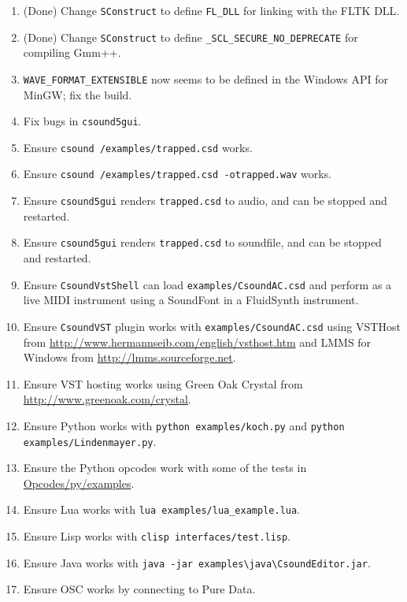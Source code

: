 \documentclass[11pt,letterpaper,onecolumn]{scrartcl}
\begin{document}
\begin{sloppypar}
\begin{enumerate}
	\item (Done) Change \texttt{SConstruct} to define \verb|FL_DLL| for linking with the FLTK DLL.
	\item (Done) Change \texttt{SConstruct} to define \verb|_SCL_SECURE_NO_DEPRECATE| for compiling Gmm++.
	\item \verb|WAVE_FORMAT_EXTENSIBLE| now seems to be defined in the Windows API for MinGW; fix the build.
	\item Fix bugs in \texttt{csound5gui}.
	\item Ensure \texttt{csound /examples/trapped.csd} works.
	\item Ensure \texttt{csound /examples/trapped.csd -otrapped.wav} works.
	\item Ensure \texttt{csound5gui} renders \texttt{trapped.csd} to audio, and can be stopped and restarted.
	\item Ensure \texttt{csound5gui} renders \texttt{trapped.csd} to soundfile, and can be stopped and restarted.
	\item Ensure \texttt{CsoundVstShell} can load \texttt{examples/CsoundAC.csd} and perform as a live MIDI instrument using a SoundFont in a FluidSynth instrument.
	\item Ensure \texttt{CsoundVST} plugin works with \texttt{examples/CsoundAC.csd} using VSTHost from \url{http://www.hermannseib.com/english/vsthost.htm} and LMMS for Windows from \url{http://lmms.sourceforge.net}.
	\item Ensure VST hosting works using Green Oak Crystal from \url{http://www.greenoak.com/crystal}.
	\item Ensure Python works with \texttt{python examples/koch.py} and \texttt{python examples/Lindenmayer.py}.
	\item Ensure the Python opcodes work with some of the tests in \url{Opcodes/py/examples}.
	\item Ensure Lua works with \verb|lua examples/lua_example.lua|.
	\item Ensure Lisp works with \verb|clisp interfaces/test.lisp|.
	\item Ensure Java works with \verb|java -jar examples\java\CsoundEditor.jar|.
	\item Ensure OSC works by connecting to Pure Data.
\end{enumerate}

\end{sloppypar}
\end{document}
